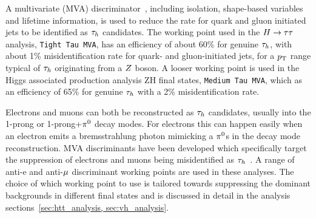 A multivariate (MVA) discriminator~\cite{Hocker:2007ht}, including isolation, shape-based variables
and lifetime information, is used to reduce the rate for  quark and gluon initiated jets
to be identified as $\tau_{h}$ candidates. The working point used in the $H\to\tau\tau$ analysis, \texttt{Tight Tau MVA},
has an efficiency of about 60\% for genuine $\tau_{h}$,
with about 1\% misidentification rate for quark- and gluon-initiated jets, for a $p_\mathrm{T}$ range typical 
of $\tau_{h}$ originating from a $Z$ boson. A looser working point is used in the Higgs associated 
production analysis ZH final states, \texttt{Medium Tau MVA}, which as an efficiency of 65\% for genuine
$\tau_{h}$ with a 2\% misidentification rate.

Electrons and muons can both be reconstructed as $\tau_{h}$ candidates, usually into the 1-prong or
1-prong+$\pi^{0}$ decay modes. For electrons this can happen easily when an electron emits a bremsstrahlung
photon mimicking a $\pi^{0}$s in the decay mode reconstruction. MVA discriminants have been developed 
which specifically target the suppression of electrons and muons being misidentified as 
$\tau_{h}$~\cite{Khachatryan:2015dfa, CMS-PAS-TAU-16-002}.
A range of anti-e and anti-$\mu$ discriminant working points are used in these analyses. The choice
of which working point to use is tailored towards suppressing the dominant backgrounds in different
final states and is discussed in detail in the analysis sections~\ref{sec:htt_analysis, sec:vh_analysis}.


